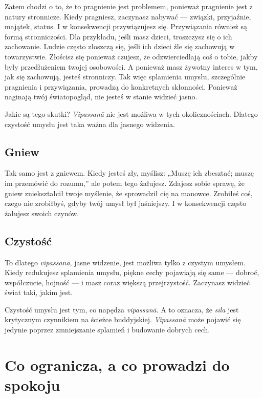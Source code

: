 \documentclass[12pt,openany]{book}
\begin{document}
Zatem chodzi o to, że to pragnienie jest problemem, ponieważ pragnienie jest z natury stronnicze. Kiedy pragniesz, zaczynasz nabywać --- związki, przyjaźnie, majątek, status. I w konsekwencji przywiązujesz się. Przywiązania również są formą stronniczości. Dla przykładu, jeśli masz dzieci, troszczysz się o ich zachowanie. Ludzie często złoszczą się, jeśli ich dzieci źle się zachowują w towarzystwie. Złościsz się ponieważ czujesz, że odzwierciedlają coś o tobie, jakby były przedłużeniem twojej osobowości. A ponieważ masz żywotny interes w tym, jak się zachowują, jesteś stronniczy. Tak więc splamienia umysłu, szczególnie pragnienia i przywiązania, prowadzą do konkretnych skłonności. Ponieważ naginają twój światopogląd, nie jesteś w stanie widzieć jasno.

Jakie są tego skutki? \textit{Vipassanā} nie jest możliwa w tych okolicznościach. Dlatego czystość umysłu jest taka ważna dla jasnego widzenia.

\section*{Gniew}

Tak samo jest z gniewem. Kiedy jesteś zły, myślisz: „Muszę ich zbesztać; muszę im przemówić do rozumu,” ale potem tego żałujesz. Zdajesz sobie sprawę, że gniew zniekształcił twoje myślenie, że sprowadził cię na manowce. Zrobiłeś coś, czego nie zrobiłbyś, gdyby twój umysł był jaśniejszy. I w konsekwencji często żałujesz swoich czynów.

\section*{Czystość}

To dlatego \textit{vipassanā}, jasne widzenie, jest możliwa tylko z czystym umysłem. Kiedy redukujesz splamienia umysłu, piękne cechy pojawiają się same --- dobroć, współczucie, hojność --- i masz coraz większą przejrzystość. Zaczynasz widzieć świat taki, jakim jest.

Czystość umysłu jest tym, co napędza \textit{vipassanā}. A to oznacza, że  \textit{sīla} jest krytycznym czynnikiem na ścieżce buddyjskiej. \textit{Vipassanā} może pojawić się jedynie poprzez zmniejszanie splamień i budowanie dobrych cech.

\chapter*{Co ogranicza, a co prowadzi do spokoju}
\end{document}
